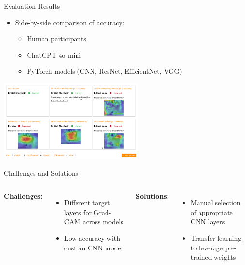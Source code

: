 \documentclass{beamer}
\begin{document}
\begin{frame}{Evaluation Results}

    \begin{itemize}
        \item Side-by-side comparison of accuracy:
        \begin{itemize}
            \item Human participants
            \item ChatGPT-4o-mini
            \item PyTorch models (CNN, ResNet, EfficientNet, VGG)
        \end{itemize}
    \end{itemize}    
    \begin{center}
        \includegraphics[width=0.55\textwidth]{evaluation.png}
    \end{center}
\end{frame}

\begin{frame}{Challenges and Solutions}
    \begin{columns}[T]
        \textbf{\textcolor{accentcolor}{Challenges:}}
        \begin{itemize}
            \item Different target layers for Grad-CAM across models
            \item Low accuracy with custom CNN model
        \end{itemize}
        
        \textbf{\textcolor{highlightcolor}{Solutions:}}
        \begin{itemize}
            \item Manual selection of appropriate CNN layers
            \item Transfer learning to leverage pre-trained weights
        \end{itemize}
    \end{columns}
\end{frame}
\end{document}
